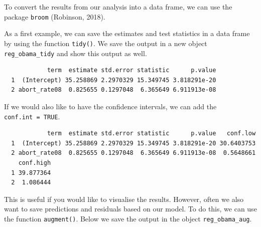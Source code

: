 \documentclass[12pt,oneside]{reedthesis}
\theoremstyle{definition}
\theoremstyle{definition}
\theoremstyle{definition}
\theoremstyle{remark}
\begin{document}
  To convert the results from our analysis into a data frame, we can use
  the package \texttt{broom} (Robinson, 2018).
  \begin{Shaded}
  \begin{Highlighting}[]
  \NormalTok{(}\NormalTok{)}
  \end{Highlighting}
  \end{Shaded}
  As a first example, we can save the estimates and test statistics in a
  data frame by using the function \texttt{tidy()}. We save the output in
  a new object \texttt{reg\_obama\_tidy} and show this output as well.
  \begin{Shaded}
  \begin{Highlighting}[]
  \StringTok{ }
  
  \end{Highlighting}
  \end{Shaded}
  \begin{verbatim}
            term  estimate std.error statistic      p.value
  1  (Intercept) 35.258869 2.2970329 15.349745 3.818291e-20
  2 abort_rate08  0.825655 0.1297048  6.365649 6.911913e-08
  \end{verbatim}
  If we would also like to have the confidence intervals, we can add the
  \texttt{conf.int\ =\ TRUE}.
  \begin{Shaded}
  \begin{Highlighting}[]
  \StringTok{ } \NormalTok{)}
  
  \end{Highlighting}
  \end{Shaded}
  \begin{verbatim}
            term  estimate std.error statistic      p.value   conf.low
  1  (Intercept) 35.258869 2.2970329 15.349745 3.818291e-20 30.6403753
  2 abort_rate08  0.825655 0.1297048  6.365649 6.911913e-08  0.5648661
    conf.high
  1 39.877364
  2  1.086444
  \end{verbatim}
  This is useful if you would like to visualise the results. However,
  often we also want to save predictions and residuals based on our model.
  To do this, we can use the function \texttt{augment()}. Below we save
  the output in the object \texttt{reg\_obama\_aug}.
  \begin{Shaded}
  \begin{Highlighting}[]
  \StringTok{ }
  \end{Highlighting}
  \end{Shaded}
\end{document}

